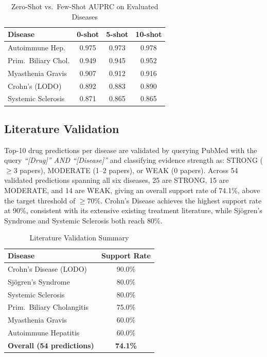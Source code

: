 \documentclass[conference]{IEEEtran}
\begin{document}
\begin{table}[!t]
\caption{Zero-Shot vs.\ Few-Shot AUPRC on Evaluated Diseases}
\label{tab:fewshot}
\centering
\footnotesize
\renewcommand{\arraystretch}{1.4}
\begin{tabular}{p{2.3cm}ccc}
\toprule
\textbf{Disease} & \textbf{0-shot} & \textbf{5-shot} & \textbf{10-shot} \\
\midrule
Autoimmune Hep. & 0.975 & 0.973 & 0.978 \\
Prim.\ Biliary Chol. & 0.949 & 0.945 & 0.952 \\
Myasthenia Gravis & 0.907 & 0.912 & 0.916 \\
Crohn's (LODO) & 0.892 & 0.883 & 0.890 \\
Systemic Sclerosis & 0.871 & 0.865 & 0.865 \\
\bottomrule
\end{tabular}
\end{table}

\subsection{Literature Validation}

Top-10 drug predictions per disease are validated by querying PubMed with the query \textit{``[Drug]'' AND ``[Disease]''} and classifying evidence strength as: STRONG ($\geq 3$ papers), MODERATE (1--2 papers), or WEAK (0 papers). Across 54 validated predictions spanning all six diseases, 25 are STRONG, 15 are MODERATE, and 14 are WEAK, giving an overall support rate of 74.1\%, above the target threshold of $\geq 70\%$. Crohn's Disease achieves the highest support rate at 90\%, consistent with its extensive existing treatment literature, while Sj\"{o}gren's Syndrome and Systemic Sclerosis both reach 80\%.

\begin{table}[!t]
\caption{Literature Validation Summary}
\label{tab:literature}
\centering
\footnotesize
\renewcommand{\arraystretch}{1.4}
\begin{tabular}{p{2.8cm}c}
\toprule
\textbf{Disease} & \textbf{Support Rate} \\
\midrule
Crohn's Disease (LODO) & 90.0\% \\
Sj\"{o}gren's Syndrome & 80.0\% \\
Systemic Sclerosis & 80.0\% \\
Prim.\ Biliary Cholangitis & 75.0\% \\
Myasthenia Gravis & 60.0\% \\
Autoimmune Hepatitis & 60.0\% \\
\midrule
\textbf{Overall (54 predictions)} & \textbf{74.1\%} \\
\bottomrule
\end{tabular}
\end{table}
\end{document}

